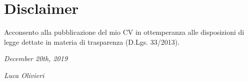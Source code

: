\documentclass[]{friggeri-cv}
\begin{document}
\section{Disclaimer}
Acconsento alla pubblicazione del mio CV in ottemperanza alle disposizioni di legge dettate in materia di trasparenza (D.Lgs. 33/2013).

\begin{flushleft}
\emph{December 20th, 2019}
\end{flushleft}
\begin{flushright}
\emph{Luca Olivieri}
\end{flushright}

% 
\end{document}
